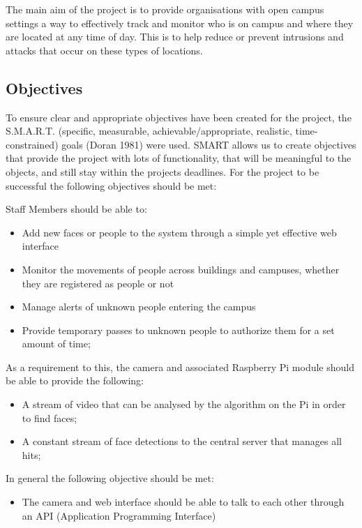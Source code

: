 \documentclass[
  english,
  a4paper,
,tablecaptionabove
]{scrartcl}
\providecommand{\tightlist}{%
  \setlength{\itemsep}{0pt}\setlength{\parskip}{0pt}}
\begin{document}
The main aim of the project is to provide organisations with open campus
settings a way to effectively track and monitor who is on campus and
where they are located at any time of day. This is to help reduce or
prevent intrusions and attacks that occur on these types of locations.

\hypertarget{objectives}{%
\subsection{Objectives}\label{objectives}}

To ensure clear and appropriate objectives have been created for the
project, the S.M.A.R.T. (specific, measurable, achievable/appropriate,
realistic, time-constrained) goals (Doran 1981) were used. SMART allows
us to create objectives that provide the project with lots of
functionality, that will be meaningful to the objects, and still stay
within the projects deadlines. For the project to be successful the
following objectives should be met:

Staff Members should be able to:

\begin{itemize}
\tightlist
\item
  Add new faces or people to the system through a simple yet effective
  web interface
\item
  Monitor the movements of people across buildings and campuses, whether
  they are registered as people or not
\item
  Manage alerts of unknown people entering the campus
\item
  Provide temporary passes to unknown people to authorize them for a set
  amount of time;
\end{itemize}

As a requirement to this, the camera and associated Raspberry Pi module
should be able to provide the following:

\begin{itemize}
\tightlist
\item
  A stream of video that can be analysed by the algorithm on the Pi in
  order to find faces;
\item
  A constant stream of face detections to the central server that
  manages all hits;
\end{itemize}

In general the following objective should be met:

\begin{itemize}
\tightlist
\item
  The camera and web interface should be able to talk to each other
  through an API (Application Programming Interface)
\end{itemize}
\end{document}

